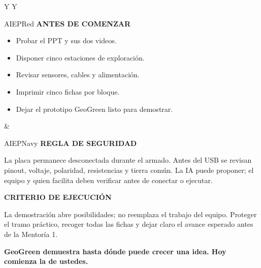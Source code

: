 \documentclass[9.5pt,a4paper]{article}
\newcommand{\labelx}[1]{{\scriptsize\bfseries\color{AIEPRed}\MakeUppercase{#1}}\par}
\begin{document}
\begin{tabularx}{\textwidth}{Y Y}
\begin{boxa}[height=42mm,valign=top]{AIEPRed}
\labelx{Antes de comenzar}
\begin{itemize}
  \item Probar el PPT y sus dos videos.
  \item Disponer cinco estaciones de exploración.
  \item Revisar sensores, cables y alimentación.
  \item Imprimir cinco fichas por bloque.
  \item Dejar el prototipo GeoGreen listo para demostrar.
\end{itemize}
\end{boxa}
&
\begin{boxa}[height=42mm,valign=top]{AIEPNavy}
\labelx{Regla de seguridad}
La placa permanece desconectada durante el armado. Antes del USB se revisan pinout, voltaje,
polaridad, resistencias y tierra común. La IA puede proponer; el equipo y quien facilita deben
verificar antes de conectar o ejecutar.
\end{boxa}
\end{tabularx}

\begin{tcolorbox}[colback=AIEPBlueSoft,colframe=AIEPNavy,boxrule=.65pt,arc=1mm,left=3mm,right=3mm,top=2.5mm,bottom=2.5mm]
\labelx{Criterio de ejecución}
La demostración abre posibilidades; no reemplaza el trabajo del equipo. Proteger el tramo práctico,
recoger todas las fichas y dejar claro el avance esperado antes de la Mentoría 1.
\end{tcolorbox}

\begin{tcolorbox}[colback=AIEPRed,colframe=AIEPRed,arc=1mm,halign=center,top=2.5mm,bottom=2.5mm]
{\large\bfseries\color{white}GeoGreen demuestra hasta dónde puede crecer una idea. Hoy comienza la de ustedes.}
\end{tcolorbox}
\end{document}
